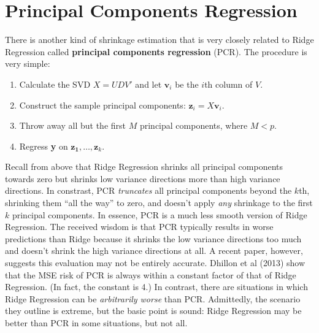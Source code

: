 \documentclass[12pt]{article}
\theoremstyle{definition}
\begin{document}
\section{Principal Components Regression}
There is another kind of shrinkage estimation that is very closely related to Ridge Regression called \textbf{principal components regression} (PCR). The procedure is very simple:
	\begin{enumerate}
		\item Calculate the SVD $X=UDV'$ and let $\mathbf{v}_i$ be the $i$th column of $V$.
		\item Construct the sample principal components: $\mathbf{z}_i = X \mathbf{v}_i$.
		\item Throw away all but the first $M$ principal components, where $M <p$.
		\item Regress \textbf{y} on $\mathbf{z_1}, \hdots, \mathbf{z}_k$. 
	\end{enumerate}
Recall from above that Ridge Regression shrinks all principal components towards zero but shrinks low variance directions more than high variance directions. In constrast, PCR \emph{truncates} all principal components beyond the $k$th, shrinking them ``all the way'' to zero, and doesn't apply \emph{any} shrinkage to the first $k$ principal components. In essence, PCR is a much less smooth version of Ridge Regression. The received wisdom is that PCR typically results in worse predictions than Ridge because it shrinks the low variance directions too much and doesn't shrink the high variance directions at all. A recent paper, however, suggests this evaluation may not be entirely accurate. Dhillon et al (2013) show that the MSE risk of PCR is always within a constant factor of that of Ridge Regression. (In fact, the constant is 4.) In contrast, there are situations in which Ridge Regression can be \emph{arbitrarily worse} than PCR. Admittedly, the scenario they outline is extreme, but the basic point is sound: Ridge Regression may be better than PCR in some situations, but not all. 
\end{document}
